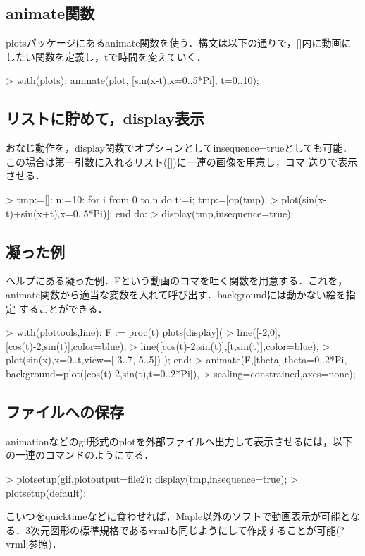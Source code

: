 \subsection{animate関数}
plotsパッケージにあるanimate関数を使う．構文は以下の通りで，[]内に動画にしたい関数を定義し，tで時間を変えていく．
\begin{MapleInput}
> with(plots): animate(plot, [sin(x-t),x=0..5*Pi], t=0..10);
\end{MapleInput}

\subsection{リストに貯めて，display表示}
おなじ動作を，display関数でオプションとしてinsequence=trueとしても可能．この場合は第一引数に入れるリスト([])に一連の画像を用意し，コマ
送りで表示させる．
\begin{MapleInput}
> tmp:=[]: n:=10: for i from 0 to n do t:=i; tmp:=[op(tmp),
> plot(sin(x-t)+sin(x+t),x=0..5*Pi)]; end do:
> display(tmp,insequence=true);
\end{MapleInput}

\subsection{凝った例}
ヘルプにある凝った例．Fという動画のコマを吐く関数を用意する．これを，animate関数から適当な変数を入れて呼び出す．backgroundには動かない絵を指定
することができる．
\begin{MapleInput}
> with(plottools,line): F := proc(t) plots[display](
> line([-2,0],[cos(t)-2,sin(t)],color=blue),
> line([cos(t)-2,sin(t)],[t,sin(t)],color=blue),
> plot(sin(x),x=0..t,view=[-3..7,-5..5]) ); end:
> animate(F,[theta],theta=0..2*Pi, background=plot([cos(t)-2,sin(t),t=0..2*Pi]),
> scaling=constrained,axes=none);
\end{MapleInput}
\begin{MapleOutput}
\end{MapleOutput}

\subsection{ファイルへの保存}
animationなどのgif形式のplotを外部ファイルへ出力して表示させるには，以下の一連のコマンドのようにする．
\begin{MapleInput}
> plotsetup(gif,plotoutput=file2): display(tmp,insequence=true);
> plotsetup(default):
\end{MapleInput}
こいつをquicktimeなどに食わせれば，Maple以外のソフトで動画表示が可能となる．3次元図形の標準規格であるvrmlも同じようにして作成することが可能(?vrml;参照)．
